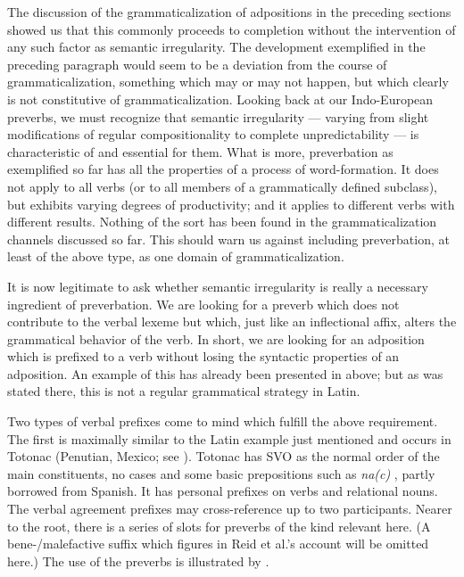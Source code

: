 The discussion of the grammaticalization of adpositions in the preceding sections showed us that this commonly proceeds to completion without the intervention of any such factor as semantic irregularity. The development exemplified in the preceding paragraph would seem to be a deviation from the course of grammaticalization, something which may or may not happen, but which clearly is not constitutive of grammaticalization. Looking back at our Indo-European preverbs, we must recognize that semantic irregularity — varying from slight modifications of regular compositionality to complete unpredictability — is characteristic of and essential for them. What is more, preverbation as exemplified so far has all the properties of a process of word-formation. It does not apply to all verbs (or to all members of a grammatically defined subclass), but exhibits varying degrees of productivity; and it applies to different verbs with different results. Nothing of the sort has been found in the grammaticalization channels discussed so far. This should warn us against including preverbation, at least of the above type, as one domain of grammaticalization.

It is now legitimate to ask whether semantic irregularity is really a necessary ingredient of preverbation. We are looking for a preverb which does not contribute to the verbal lexeme but which, just like an inflectional affix, alters the grammatical behavior of the verb. In short, we are looking for an adposition which is prefixed to a verb without losing the syntactic properties of an adposition. An example of this has already been presented in  above; but as was stated there, this is not a regular grammatical strategy in Latin.

Two types of verbal prefixes come to mind which fulfill the above requirement. The first is maximally similar to the Latin example just mentioned and occurs in Totonac (Penutian, Mexico; see \citealt[24--30]{Reid1968}). Totonac has SVO as the normal order of the main constituents, no cases and some basic prepositions such as \textit{na(c)} \glloc, partly borrowed from Spanish. It has personal prefixes on verbs and relational nouns. The verbal agreement prefixes may cross-reference up to two participants. Nearer to the root, there is a series of slots for preverbs of the kind relevant here. (A bene-/malefactive suffix which figures in Reid et al.'s account will be omitted here.) The use of the preverbs is illustrated by .

